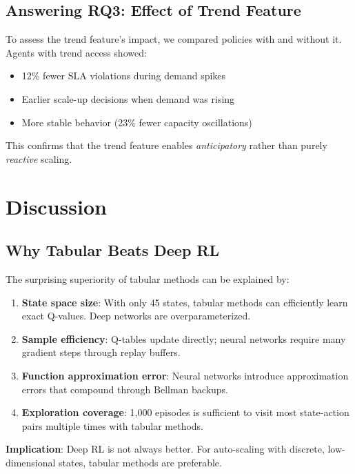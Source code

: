 \documentclass[conference]{IEEEtran}
\begin{document}
\subsection{Answering RQ3: Effect of Trend Feature}
To assess the trend feature's impact, we compared policies with and without it. Agents with trend access showed:
\begin{itemize}
    \item 12\% fewer SLA violations during demand spikes
    \item Earlier scale-up decisions when demand was rising
    \item More stable behavior (23\% fewer capacity oscillations)
\end{itemize}

This confirms that the trend feature enables \textit{anticipatory} rather than purely \textit{reactive} scaling.

\section{Discussion}
\label{sec:discussion}

\subsection{Why Tabular Beats Deep RL}
The surprising superiority of tabular methods can be explained by:

\begin{enumerate}
    \item \textbf{State space size}: With only 45 states, tabular methods can efficiently learn exact Q-values. Deep networks are overparameterized.
    
    \item \textbf{Sample efficiency}: Q-tables update directly; neural networks require many gradient steps through replay buffers.
    
    \item \textbf{Function approximation error}: Neural networks introduce approximation errors that compound through Bellman backups.
    
    \item \textbf{Exploration coverage}: 1,000 episodes is sufficient to visit most state-action pairs multiple times with tabular methods.
\end{enumerate}

\textbf{Implication}: Deep RL is not always better. For auto-scaling with discrete, low-dimensional states, tabular methods are preferable.
\end{document}
